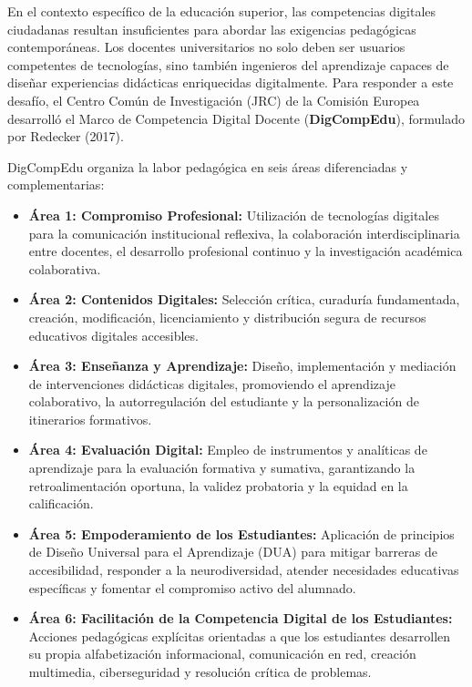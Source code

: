 En el contexto específico de la educación superior, las competencias digitales ciudadanas resultan insuficientes para abordar las exigencias pedagógicas contemporáneas. Los docentes universitarios no solo deben ser usuarios competentes de tecnologías, sino también ingenieros del aprendizaje capaces de diseñar experiencias didácticas enriquecidas digitalmente. Para responder a este desafío, el Centro Común de Investigación (JRC) de la Comisión Europea desarrolló el Marco de Competencia Digital Docente (\textbf{DigCompEdu}), formulado por Redecker (2017).

DigCompEdu organiza la labor pedagógica en seis áreas diferenciadas y complementarias:
\begin{itemize}
    \item \textbf{Área 1: Compromiso Profesional:} Utilización de tecnologías digitales para la comunicación institucional reflexiva, la colaboración interdisciplinaria entre docentes, el desarrollo profesional continuo y la investigación académica colaborativa.
    \item \textbf{Área 2: Contenidos Digitales:} Selección crítica, curaduría fundamentada, creación, modificación, licenciamiento y distribución segura de recursos educativos digitales accesibles.
    \item \textbf{Área 3: Enseñanza y Aprendizaje:} Diseño, implementación y mediación de intervenciones didácticas digitales, promoviendo el aprendizaje colaborativo, la autorregulación del estudiante y la personalización de itinerarios formativos.
    \item \textbf{Área 4: Evaluación Digital:} Empleo de instrumentos y analíticas de aprendizaje para la evaluación formativa y sumativa, garantizando la retroalimentación oportuna, la validez probatoria y la equidad en la calificación.
    \item \textbf{Área 5: Empoderamiento de los Estudiantes:} Aplicación de principios de Diseño Universal para el Aprendizaje (DUA) para mitigar barreras de accesibilidad, responder a la neurodiversidad, atender necesidades educativas específicas y fomentar el compromiso activo del alumnado.
    \item \textbf{Área 6: Facilitación de la Competencia Digital de los Estudiantes:} Acciones pedagógicas explícitas orientadas a que los estudiantes desarrollen su propia alfabetización informacional, comunicación en red, creación multimedia, ciberseguridad y resolución crítica de problemas.
\end{itemize}

